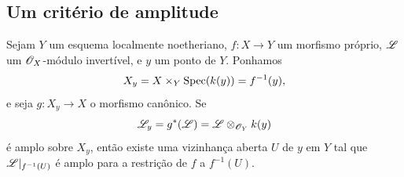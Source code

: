 \subsection{Um critério de amplitude}
\label{subsection:III.4.7}

\begin{theorem}[4.7.1]
\label{III.4.7.1}
Sejam $Y$ um esquema localmente noetheriano, $f:X\to Y$ um
morfismo próprio, $\mathscr{L}$ um $\mathscr{O}_X$-módulo invertível,
e $y$ um ponto de $Y$. Ponhamos
\[
  X_y=X\times_Y\operatorname{Spec}(k(y))=f^{-1}(y),
\]
e seja $g:X_y\to X$ o morfismo canônico. Se
\[
  \mathscr{L}_y=g^*(\mathscr{L})
  =\mathscr{L}\otimes_{\mathscr{O}_Y}k(y)
\]
é amplo sobre $X_y$, então existe uma vizinhança aberta $U$ de $y$
em $Y$ tal que $\mathscr{L}|_{f^{-1}(U)}$ é amplo para a restrição
de $f$ a $f^{-1}(U)$.
\end{theorem}

